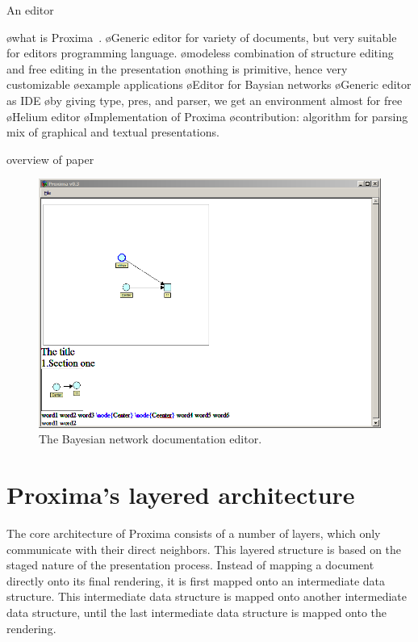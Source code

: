 \documentclass[12pt]{article}
\begin{document}
An editor


\bl
\o what is Proxima~\cite{schrage04Proxima}.
\o Generic editor for variety of documents, but very suitable for editors programming language.
\o modeless combination of structure editing and free editing in the presentation
\o nothing is primitive, hence very customizable
\o example applications
\o Editor for Baysian networks
\o Generic editor as IDE
\o by giving type, pres, and parser, we get an environment almost for free
\o Helium editor
\o Implementation of Proxima
\el
\bl
\o contribution: algorithm for parsing mix of graphical and textual presentations.
\el

overview of paper 
\bc
\begin{figure}[ht]
\centering
\includegraphics[width=\textwidth]{images/screenshots/BayesDocEditor}
\caption{The Bayesian network documentation editor.}
\label{fig:bayesEditor}
\end{figure}
\ec

%
\section{Proxima's layered architecture} \label{sect:tarchitecture}
%

The core architecture of Proxima consists of a number of layers, which only communicate with their direct neighbors. This layered structure is based on the staged nature of the presentation process. Instead of mapping a document directly onto its final rendering, it is first mapped onto an intermediate data structure. This intermediate data structure is mapped onto another intermediate data structure, until the last intermediate data structure is mapped onto the rendering.
\end{document}
